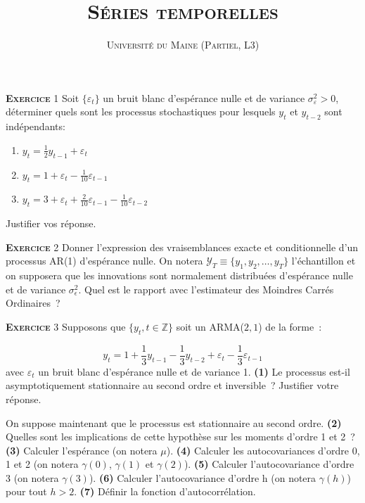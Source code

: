 \documentclass[10pt,a4paper,notitlepage,twocolumn]{article}
\newcommand{\exercice}[1]{\textsc{\textbf{Exercice}} #1}
\newcommand{\question}[1]{\textbf{(#1)}}
\begin{document}
\title{\textsc{Séries temporelles}}
\author{\textsc{Université du Maine (Partiel, L3)}}
\date{}


\maketitle


\exercice{1} Soit $\{\varepsilon_t\}$ un bruit blanc d'espérance nulle
et de variance $\sigma_{\varepsilon}^2>0$, déterminer quels sont les
processus stochastiques pour lesquels $y_t$ et $y_{t-2}$ sont
indépendants:
\begin{enumerate}
\item $y_t = \frac{1}{2}y_{t-1} + \varepsilon_t$
\item $y_t = 1 + \varepsilon_t - \frac{1}{10} \varepsilon_{t-1}$
\item $y_t = 3 + \varepsilon_t + \frac{2}{10} \varepsilon_{t-1} - \frac{1}{10} \varepsilon_{t-2}$
\end{enumerate}
Justifier vos réponse.\newline

\bigskip

\exercice{2} Donner l'expression des vraisemblances exacte et
conditionnelle d'un processus AR(1) d'espérance nulle. On notera
$\mathcal Y_T \equiv \{y_1,y_2,\dots,y_T\}$ l'échantillon et on
supposera que les innovations sont normalement distribuées d'espérance
nulle et de variance $\sigma_{\epsilon}^2$. Quel est le rapport avec
l'estimateur des Moindres Carrés Ordinaires ?\newline

\bigskip

\exercice{3} Supposons que $\{y_t,t\in\mathbb Z\}$ soit un ARMA($2,1$) de la forme :

\[
y_t = 1 + \frac{1}{3}y_{t-1} - \frac{1}{3}y_{t-2} + \varepsilon_t - \frac{1}{3} \varepsilon_{t-1}
\]
avec $\varepsilon_t$ un bruit blanc d'espérance nulle et de variance
1. \question{1} Le processus est-il asymptotiquement stationnaire au
second ordre et inversible~?  Justifier votre réponse.\newline

On suppose maintenant que le processus est stationnaire au second
ordre. \question{2} Quelles sont les implications de cette hypothèse
sur les moments d'ordre 1 et 2 ? \question{3} Calculer l'espérance (on
notera $\mu$). \question{4} Calculer les autocovariances d'ordre 0, 1
et 2 (on notera $\gamma(0)$, $\gamma(1)$ et $\gamma(2)$). \question{5}
Calculer l'autocovariance d'ordre 3 (on notera
$\gamma(3)$). \question{6} Calculer l'autocovariance d'ordre h (on
notera $\gamma(h)$) pour tout $h>2$.  \question{7} Définir la fonction
d'autocorrélation.\newline
\end{document}
